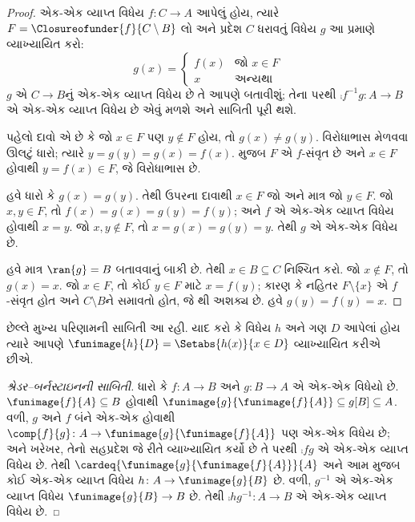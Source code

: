 \begin{proof}
એક-એક વ્યાપ્ત વિધેય $f \colon C \to A$ આપેલું હોય, ત્યારે $F =
\Closureofunder{f}{C \setminus B}$ લો અને પ્રદેશ $C$ ધરાવતું વિધેય
$g$ આ પ્રમાણે વ્યાખ્યાયિત કરો:
\[
	g(x) =
	\begin{cases}
			f(x) &\text{જો $x \in F$}\\
			x & \text{અન્યથા}
		\end{cases}
\]
$g$ એ $C \to B$નું એક-એક વ્યાપ્ત વિધેય છે તે આપણે બતાવીશું; તેના પરથી
$\comp{f^{-1}}{g} \colon A \to B$ એ એક-એક વ્યાપ્ત વિધેય છે એવું મળશે અને
સાબિતી પૂરી થશે.

પહેલો દાવો એ છે કે જો $x \in F$ પણ $y\notin F$ હોય, તો
$g(x) \neq g(y)$. વિરોધાભાસ મેળવવા ઊલટું ધારો; ત્યારે
$y = g(y) = g(x) = f(x)$.  મુજબ $F$ એ
$f$-સંવૃત છે અને $x \in F$ હોવાથી $y = f(x) \in F$, જે વિરોધાભાસ છે.

હવે ધારો કે $g(x) = g(y)$. તેથી ઉપરના દાવાથી $x \in F$ જો અને માત્ર
જો $y \in F$. જો $x, y \in F$, તો $f(x) = g (x) = g(y) = f(y)$;
અને $f$ એ એક-એક વ્યાપ્ત વિધેય હોવાથી $x = y$. જો $x, y \notin F$, તો
$x = g(x) = g(y) = y$. તેથી $g$ એ એક-એક વિધેય છે.

હવે માત્ર $\ran{g} = B$ બતાવવાનું બાકી છે. તેથી $x \in B \subseteq C$
નિશ્ચિત કરો. જો $x \notin F$, તો $g(x) = x$. જો $x \in F$, તો કોઈ
$y \in F$ માટે $x = f(y)$; કારણ કે નહિતર $F \setminus \{x\}$ એ
$f$-સંવૃત હોત અને $C\setminus B$ને સમાવતો હોત, જે
થી અશક્ય છે. હવે $g(y) = f(y) = x$.
\end{proof}

છેલ્લે મુખ્ય પરિણામની સાબિતી આ રહી. યાદ કરો કે વિધેય $h$ અને ગણ $D$
આપેલાં હોય ત્યારે આપણે $\funimage{h}{D} = \Setabs{h(x)}{x
\in D}$ વ્યાખ્યાયિત કરીએ છીએ.

\begin{proof}[શ્રેડર--બર્નસ્ટાઇનની સાબિતી] ધારો કે $f \colon A \to B$
અને $g \colon B \to A$ એ એક-એક વિધેયો છે. $\funimage{f}{A}
\subseteq B$ હોવાથી $\funimage{g}{\funimage{f}{A}} \subseteq
g[B] \subseteq A$. વળી, $g$ અને $f$ બંને એક-એક હોવાથી
$\comp{f}{g} \colon A \to \funimage{g}{\funimage{f}{A}}$ પણ
એક-એક વિધેય છે; અને ખરેખર, તેનો સહપ્રદેશ જે રીતે વ્યાખ્યાયિત કર્યો
છે તે પરથી $\comp{f}{g}$ એ એક-એક વ્યાપ્ત વિધેય છે. તેથી
$\cardeq{\funimage{g}{\funimage{f}{A}}}{A}$ અને આમ
 મુજબ કોઈ એક-એક વ્યાપ્ત વિધેય $h \colon A \to
\funimage{g}{B}$ છે. વળી, $g^{-1}$ એ એક-એક વ્યાપ્ત વિધેય
$\funimage{g}{B} \to B$ છે. તેથી $\comp{h}{g^{-1}} \colon A \to B$
એ એક-એક વ્યાપ્ત વિધેય છે.
\end{proof}
\endgroup
\endgroup


